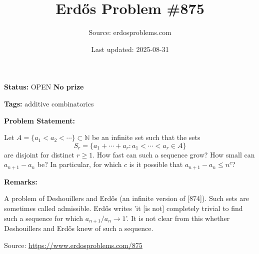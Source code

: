 \documentclass{article}
\title{Erd\H{o}s Problem \#875}
\date{Last updated: 2025-08-31}
\author{Source: erdosproblems.com}
\begin{document}
\maketitle

\noindent\textbf{Status:} OPEN \quad \textbf{No prize}

\noindent\textbf{Tags:} additive combinatorics

\medskip
\noindent\textbf{Problem Statement:}

Let $A=\{a_1<a_2<\cdots\}\subset \mathbb{N}$ be an infinite set such that the sets\[S_r = \{ a_1+\cdots +a_r : a_1<\cdots<a_r\in A\}\]are disjoint for distinct $r\geq 1$. How fast can such a sequence grow? How small can $a_{n+1}-a_n$ be? In particular, for which $c$ is it possible that $a_{n+1}-a_n\leq n^{c}$?

\bigskip
\noindent\textbf{Remarks:}

A problem of Deshouillers and Erd\H{o}s (an infinite version of [874]). Such sets are sometimes called admissible. Erd\H{o}s writes 'it [is not] completely trivial to find such a sequence for which $a_{n+1}/a_n\to 1$'. It is not clear from this whether Deshouillers and Erd\H{o}s knew of such a sequence.

\bigskip
\noindent\small{Source: \url{https://www.erdosproblems.com/875}}
\end{document}
